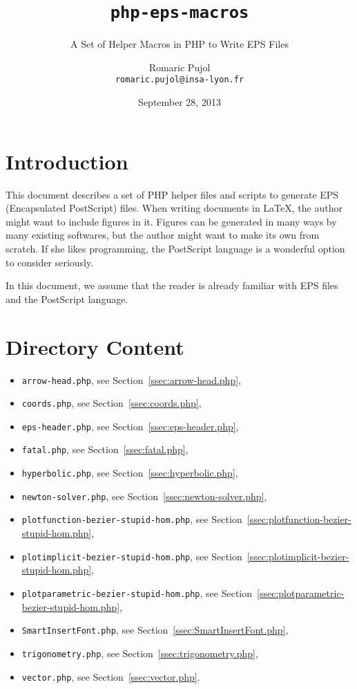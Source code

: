 \documentclass[10pt,a4paper]{scrartcl}
\title{\texttt{php-eps-macros}}
\subtitle{A Set of Helper Macros in PHP to Write EPS Files}
\author{Romaric Pujol\\\footnotesize{\texttt{romaric.pujol@insa-lyon.fr}}}
\date{September 28, 2013}
\newcommand\PS{PostScript}
\begin{document}
\maketitle
\section{Introduction}
This document describes a set of PHP helper files and scripts to generate EPS
   (Encapsulated \PS) files.
When writing documents in \LaTeX, the author might want to include figures in
   it.
Figures can be generated in many ways by many existing softwares, but the
   author might want to make its own from scratch.
If she likes programming, the PostScript language is a wonderful option to
   consider seriously.

In this document, we assume that the reader is already familiar with EPS files
and the \PS{} language.

\section{Directory Content}
\begin{itemize}
\item \texttt{arrow-head.php}, see Section~\ref{ssec:arrow-head.php},
\item \texttt{coords.php}, see Section~\ref{ssec:coords.php},
\item \texttt{eps-header.php}, see Section~\ref{ssec:eps-header.php},
\item \texttt{fatal.php}, see Section~\ref{ssec:fatal.php},
\item \texttt{hyperbolic.php}, see Section~\ref{ssec:hyperbolic.php},
\item \texttt{newton-solver.php}, see Section~\ref{ssec:newton-solver.php},
\item \texttt{plotfunction-bezier-stupid-hom.php}, see Section~\ref{ssec:plotfunction-bezier-stupid-hom.php},
\item \texttt{plotimplicit-bezier-stupid-hom.php}, see Section~\ref{ssec:plotimplicit-bezier-stupid-hom.php},
\item \texttt{plotparametric-bezier-stupid-hom.php}, see Section~\ref{ssec:plotparametric-bezier-stupid-hom.php},
\item \texttt{SmartInsertFont.php}, see Section~\ref{ssec:SmartInsertFont.php},
\item \texttt{trigonometry.php}, see Section~\ref{ssec:trigonometry.php},
\item \texttt{vector.php}, see Section~\ref{ssec:vector.php}.
\end{itemize}
\end{document}
